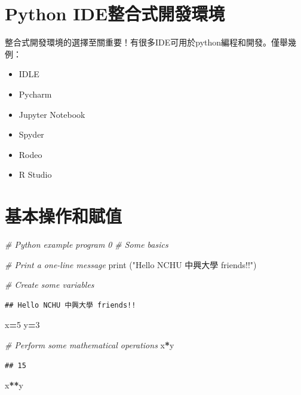 \documentclass[]{book}
\newenvironment{Shaded}{\begin{snugshade}}{\end{snugshade}}
\newcommand{\BuiltInTok}[1]{#1}
\newcommand{\CommentTok}[1]{\textcolor[rgb]{0.56,0.35,0.01}{\textit{#1}}}
\newcommand{\DecValTok}[1]{\textcolor[rgb]{0.00,0.00,0.81}{#1}}
\newcommand{\NormalTok}[1]{#1}
\newcommand{\OperatorTok}[1]{\textcolor[rgb]{0.81,0.36,0.00}{\textbf{#1}}}
\newcommand{\StringTok}[1]{\textcolor[rgb]{0.31,0.60,0.02}{#1}}
\providecommand{\tightlist}{%
  \setlength{\itemsep}{0pt}\setlength{\parskip}{0pt}}
\begin{document}
\hypertarget{python-ide}{%
\section{Python IDE整合式開發環境}\label{python-ide}}

整合式開發環境的選擇至關重要！有很多IDE可用於python編程和開發。僅舉幾例：

\begin{itemize}
\tightlist
\item
  IDLE
\item
  Pycharm
\item
  Jupyter Notebook
\item
  Spyder
\item
  Rodeo
\item
  R Studio
\end{itemize}

\hypertarget{section-6}{%
\section{基本操作和賦值}\label{section-6}}

\begin{Shaded}
\begin{Highlighting}[]
\CommentTok{# Python example program 0}
\CommentTok{# Some basics}

\CommentTok{# Print a one-line message}
\BuiltInTok{print}\NormalTok{ (}\StringTok{"Hello NCHU 中興大學 friends!!"}\NormalTok{)}

\CommentTok{# Create some variables}
\end{Highlighting}
\end{Shaded}

\begin{verbatim}
## Hello NCHU 中興大學 friends!!
\end{verbatim}

\begin{Shaded}
\begin{Highlighting}[]
\NormalTok{x}\OperatorTok{=}\DecValTok{5}
\NormalTok{y}\OperatorTok{=}\DecValTok{3}

\CommentTok{# Perform some mathematical operations}
\NormalTok{x}\OperatorTok{*}\NormalTok{y}
\end{Highlighting}
\end{Shaded}

\begin{verbatim}
## 15
\end{verbatim}

\begin{Shaded}
\begin{Highlighting}[]
\NormalTok{x}\OperatorTok{**}\NormalTok{y}
\end{Highlighting}
\end{Shaded}
\end{document}
